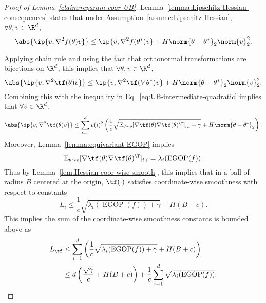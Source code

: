 \begin{proof}[Proof of Lemma~\ref{claim:reparam-coor-UB}]
    Lemma~\ref{lemma:Lipschitz-Hessian-consequences} states that under Assumption~\ref{assume:Lipschitz-Hessian}, $\forall \theta,v\in \R^d$,
    \[
        \abs{\ip{v, \nabla^2 f(\theta)v}} \leq \ip{v, \nabla^2 f(\theta^*)v} + H \norm{\theta-\theta^*}_2 \norm{v}^2_2.
    \]

    Applying chain rule and using the fact that orthonormal transformations are bijections on $\R^d$, this implies that $\forall \theta,v\in \R^d$,
    \[
        \abs{\ip{v, \nabla^2 \tf(\theta)v}} \leq
        \ip{v, \nabla^2 \tf(V\theta^*)v} + H \norm{\theta-\theta^*}_2 \norm{v}^2_2.
    \]
    Combining this with the inequality in Eq.~\ref{eq:UB-intermediate-quadratic} implies that $\forall v\in \R^d$,
    \[
        \abs{\ip{v, \nabla^2 \tf(\theta)v}} \leq\sum_{i=1}^d v(i)^2 \left(\frac{1}{c}\sqrt{\mathbb{E}_{\theta\sim\rho}[\nabla\tf(\theta)\nabla\tf(\theta)^\T]_{i,i} + \gamma} + H\norm{\theta-\theta^*}_2\right).
    \]
    Moreover, Lemma~\ref{lemma:equivariant-EGOP} implies
    \[
        \mathbb{E}_{\theta\sim\rho}[\nabla\tf(\theta)\nabla\tf(\theta)^\T]_{i,i} = \lambda_i(\operatorname{EGOP}(f)).
    \]
    Thus by Lemma~\ref{lem:Hessian-coor-wise-smooth}, this implies that in a ball of radius $B$ centered at the origin, $\tf(\cdot)$ satisfies coordinate-wise smoothness with respect to constants
    \[
        L_i \leq \frac{1}{c}\sqrt{\lambda_i(\operatorname{EGOP}(f))+\gamma} + H(B+c).
    \]
    This implies the sum of the coordinate-wise smoothness constants is bounded above as
    \begin{align*}
        L_{\tf} &\leq  \sum_{i=1}^d \left(\frac{1}{c}\sqrt{\lambda_i(\operatorname{EGOP}(f))+\gamma}  + H(B+c)\right)\\
        &\leq d\left(\frac{\sqrt{\gamma}}{c} + H(B+c)\right)+ \frac{1}{c}\sum_{i=1}^d \sqrt{\lambda_i(\operatorname{EGOP}(f))}.
    \end{align*}
\end{proof}

